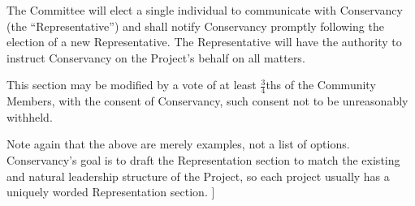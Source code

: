 \begin{itemize}
The Committee will elect a single individual to communicate with 
Conservancy (the ``Representative'') and shall notify Conservancy promptly 
following the election of a new Representative.  The Representative will 
have the authority to instruct Conservancy on the Project's behalf on all
matters.  

This section may be modified by a vote of at least $\frac{3}{4}$ths of the 
Community Members, with the consent of Conservancy, such consent not to be 
unreasonably withheld.


\end{itemize}

Note again that the above are merely examples, not a list of options.
Conservancy's goal is to draft the Representation section to match
the existing and natural leadership structure of the Project, so each
project usually has a uniquely worded Representation section. ]
